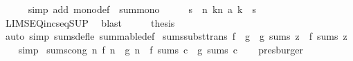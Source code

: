\begin{isabellebody}
\ \ \ \ \isamarkupfalse%
\ {\isacharparenleft}{\kern0pt}simp\ add{\isacharcolon}{\kern0pt}\ mono{\isacharunderscore}{\kern0pt}def\ {\isachardoublequoteopen}{}{\isachardoublequoteclose}\ sum{\isacharunderscore}{\kern0pt}mono{}{\isacharparenright}{\kern0pt}\isanewline
\ \ \isamarkupfalse%
\ \isamarkupfalse%
\ s\ \ {\isachardoublequoteopen}{\isacharparenleft}{\kern0pt}{\isasymlambda}n{\isachardot}{\kern0pt}\ {\isasymSum}k{\isasymle}n{\isachardot}{\kern0pt}\ a\ k{\isacharparenright}{\kern0pt}\ {\isasymlonglonglongrightarrow}\ s{\isachardoublequoteclose}\isanewline
\ \ \ \ \isamarkupfalse%
\ LIMSEQ{\isacharunderscore}{\kern0pt}incseq{\isacharunderscore}{\kern0pt}SUP\ \isamarkupfalse%
\ blast\isanewline
\ \ \isamarkupfalse%
\ \isamarkupfalse%
\ {\isacharquery}{\kern0pt}thesis\isanewline
\ \ \ \ \isamarkupfalse%
\ {\isacharparenleft}{\kern0pt}auto\ simp{\isacharcolon}{\kern0pt}\ sums{\isacharunderscore}{\kern0pt}def{\isacharunderscore}{\kern0pt}le\ summable{\isacharunderscore}{\kern0pt}def{\isacharparenright}{\kern0pt}\isanewline
{}\isamarkupfalse%
%
\endisatagproof
{\isafoldproof}%
%
\isadelimproof
%
\endisadelimproof
%
\isadelimdocument
%
\endisadelimdocument
%
\isatagdocument
%
\isamarkuptrue%
%
\endisatagdocument
{\isafolddocument}%
%
\isadelimdocument
%
\endisadelimdocument
{}\isamarkupfalse%
\ sums{\isacharunderscore}{\kern0pt}subst{\isacharbrackleft}{\kern0pt}trans{\isacharbrackright}{\kern0pt}{\isacharcolon}{\kern0pt}\ {\isachardoublequoteopen}f\ {\isacharequal}{\kern0pt}\ g\ {\isasymLongrightarrow}\ g\ sums\ z\ {\isasymLongrightarrow}\ f\ sums\ z{\isachardoublequoteclose}\isanewline
%
\isadelimproof
\ \ %
\endisadelimproof
%
\isatagproof
{}\isamarkupfalse%
\ simp%
\endisatagproof
{\isafoldproof}%
%
\isadelimproof
\isanewline
%
\endisadelimproof
\isanewline
{}\isamarkupfalse%
\ sums{\isacharunderscore}{\kern0pt}cong{\isacharcolon}{\kern0pt}\ {\isachardoublequoteopen}{\isacharparenleft}{\kern0pt}{\isasymAnd}n{\isachardot}{\kern0pt}\ f\ n\ {\isacharequal}{\kern0pt}\ g\ n{\isacharparenright}{\kern0pt}\ {\isasymLongrightarrow}\ f\ sums\ c\ {\isasymlongleftrightarrow}\ g\ sums\ c{\isachardoublequoteclose}\isanewline
%
\isadelimproof
\ \ %
\endisadelimproof
%
\isatagproof
{}\isamarkupfalse%
\ presburger%
\endisatagproof
{\isafoldproof}%
%
\isadelimproof

\end{isabellebody}
